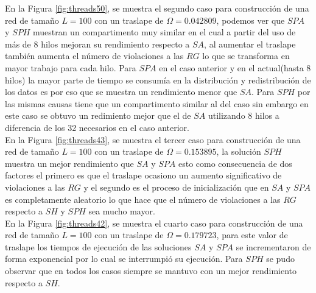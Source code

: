 En la Figura \ref{fig:threads50}, se muestra el segundo caso para construcción de una red de tamaño $L=100$ con un  traslape de $\Omega=0.042809$, podemos ver que $SPA$ y $SPH$ muestran un compartimento muy similar en el cual a partir del uso de más de 8 hilos mejoran su rendimiento respecto a $SA$, al aumentar el traslape también aumenta el número de violaciones a las $RG$ lo que se transforma en mayor trabajo para cada hilo. Para $SPA$ en el caso anterior y en el actual(hasta 8 hilos) la mayor parte de tiempo se consumía en la distribución y redistribución de los datos es por eso que se muestra un rendimiento menor que $SA$. Para $SPH$ por las mismas causas tiene que un compartimento similar al del caso  sin embargo en este caso se obtuvo un redimiento mejor que el de $SA$ utilizando 8 hilos a diferencia de los 32 necesarios en el caso anterior.\\

En la Figura \ref{fig:threads43}, se muestra el tercer caso para construcción de una red de tamaño $L=100$ con un traslape de $\Omega=0.153895$, la solución $SPH$ muestra un mejor rendimiento que $SA$ y $SPA$ esto como consecuencia de dos factores el primero es que el traslape ocasiono un aumento significativo de violaciones a las $RG$ y el segundo es el proceso de inicialización que en $SA$ y $SPA$ es completamente aleatorio lo que hace que el número de violaciones a las $RG$ respecto a $SH$ y $SPH$ sea mucho mayor.\\

En la Figura \ref{fig:threads42}, se muestra el cuarto caso para construcción de una red de tamaño $L=100$ con un traslape de $\Omega=0.179723$, para este valor de traslape los tiempos de ejecución de las soluciones $SA$ y $SPA$ se incrementaron de forma exponencial por lo cual se interrumpió su ejecución. Para $SPH$ se pudo observar que en todos los casos siempre se mantuvo con un mejor rendimiento respecto a $SH$.\\

